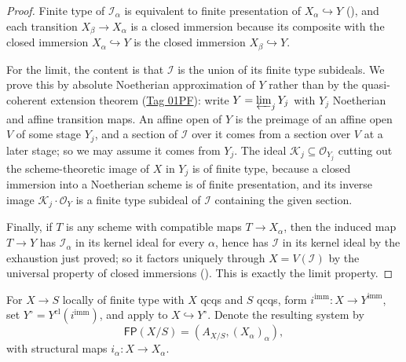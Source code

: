 \begin{proof}
  \leanok
  Finite type of $\mathcal I_\alpha$ is equivalent to finite presentation of
  $X_\alpha\hookrightarrow Y$
  (), and each transition
  $X_\beta\to X_\alpha$ is a
  closed immersion because its composite with the closed immersion
  $X_\alpha\hookrightarrow Y$ is the closed immersion
  $X_\beta\hookrightarrow Y$.

  For the limit, the content is that $\mathcal I$ is the union of its finite
  type subideals.  We prove this by absolute Noetherian approximation of $Y$
  rather than by the quasi-coherent extension theorem
  (\href{https://stacks.math.columbia.edu/tag/01PF}{Tag 01PF}): write
  $Y=\varprojlim_j Y_j$ with $Y_j$ Noetherian and affine transition maps.  An
  affine open of $Y$ is the preimage of an affine open $V$ of some stage $Y_j$,
  and a section of $\mathcal I$ over it comes from a section over $V$ at a
  later stage; so we may assume it comes from $Y_j$.  The ideal
  $\mathcal K_j\subseteq\mathcal O_{Y_j}$ cutting out the scheme-theoretic
  image of $X$ in $Y_j$ is of finite type, because a closed immersion into a
  Noetherian scheme is of finite presentation, and its inverse image
  $\mathcal K_j\cdot\mathcal O_Y$ is a finite type subideal of $\mathcal I$
  containing the given section.

  Finally, if $T$ is any scheme with compatible maps $T\to X_\alpha$, then the
  induced map $T\to Y$ has $\mathcal I_\alpha$ in its kernel ideal for every
  $\alpha$, hence has $\mathcal I$ in its kernel ideal by the exhaustion just
  proved; so it factors uniquely through $X=V(\mathcal I)$ by the universal
  property of closed immersions
  ().  This is exactly the
  limit property.
\end{proof}

\begin{definition}
  \label{def:nagata-finite-type-fp-model-system}
  \leanok

  For $X\to S$ locally of finite type with $X$ qcqs and $S$ qcqs, form
  $i^{\mathrm{imm}}\colon X\to Y^{\mathrm{imm}}$, set
  $Y^\circ=Y^{\mathrm{cl}}(i^{\mathrm{imm}})$, and apply
   to
  $X\hookrightarrow Y^\circ$.  Denote the resulting system by
  \[
    \mathsf{FP}(X/S)=(A_{X/S},(X_\alpha)_\alpha),
  \]
  with structural maps $i_\alpha\colon X\to X_\alpha$.
\end{definition}

